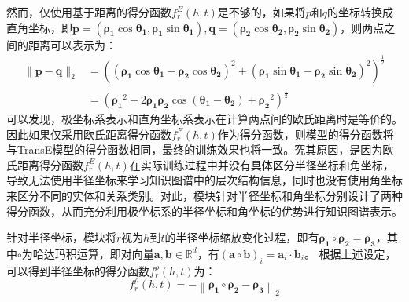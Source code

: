 \documentclass[algorithmlist, AutoFakeBold, AutoFakeSlant, figurelist, tablelist, nomlist, engineering]{seuthesix}
\begin{document}
然而，仅使用基于距离的得分函数$f^E_r(h, t)$是不够的，如果将$p$和$q$的坐标转换成直角坐标，即$\bm{p}=\left(\bm{\rho_1} \cos \bm{\theta_1}, \bm{\rho_1} \sin \bm{\theta_1}\right), \bm{q}=\left(\bm{\rho_2} \cos \bm{\theta_2}, \bm{\rho_2} \sin \bm{\theta_2}\right)$，则两点之间的距离可以表示为：
\begin{equation}
  \begin{aligned}
  \|\bm{p}-\bm{q}\|_2 & =\left(\left(\bm{\rho_1} \cos \bm{\theta_1}-\bm{\rho_2} \cos \bm{\theta_2}\right)^2+\left(\bm{\rho_1} \sin \bm{\theta_1}-\bm{\rho_2} \sin \bm{\theta_2}\right)^2\right)^{\frac{1}{2}} \\
  & =\left(\bm{\rho_1}^2-2 \bm{\rho_1} \bm{\rho_2} \cos \left(\bm{\theta_1}-\bm{\theta_2}\right)+\bm{\rho_2}^2\right)^{\frac{1}{2}}
  \end{aligned}
\end{equation}
可以发现，极坐标系表示和直角坐标系表示在计算两点间的欧氏距离时是等价的。因此如果仅采用欧氏距离得分函数$f^E_r(h, t)$作为得分函数，则模型的得分函数将与TransE模型的得分函数相同，最终的训练效果也将一致。究其原因，是因为欧氏距离得分函数$f^E_r(h, t)$在实际训练过程中并没有具体区分半径坐标和角坐标，导致无法使用半径坐标来学习知识图谱中的层次结构信息，同时也没有使用角坐标来区分不同的实体和关系类别。对此，模块针对半径坐标和角坐标分别设计了两种得分函数，从而充分利用极坐标系的半径坐标和角坐标的优势进行知识图谱表示。

针对半径坐标，模块将$r$视为$h$到$t$的半径坐标缩放变化过程，即有$\bm{\rho_1} \circ \bm{\rho_2} = \bm{\rho_3}$，其中$\circ$为哈达玛积运算，即对向量$\bm{a}, \bm{b} \in \mathbb{R}^{d}$，有$\left(\mathbf{a} \circ \mathbf{b}\right)_i = \mathbf{a}_i \cdot \mathbf{b}_i$。
根据上述设定，可以得到半径坐标的得分函数$f^{\rho}_r(h, t)$为：
\begin{equation}
  f^{\rho}_r\left(h, t\right) =-\left\|\bm{\rho_1} \circ \bm{\rho_2} - \bm{\rho_3}\right\|_2
\end{equation}
\end{document}
